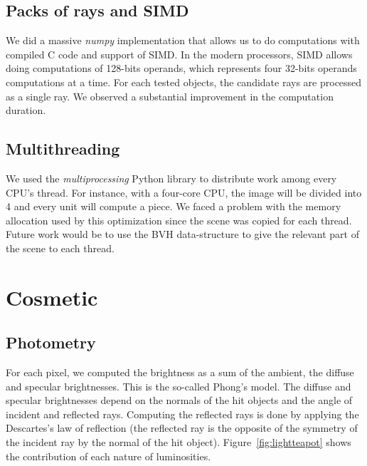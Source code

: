 \documentclass[a4paper,11pt]{article}%
\begin{document}
\subsection*{Packs of rays and SIMD}
We did a massive \textit{numpy} implementation that allows us to do computations with compiled C code and support of SIMD. In the modern processors, SIMD allows doing computations of 128-bits operands,
which represents four 32-bits operands computations at a time.
For each tested objects, the candidate rays are processed as a single ray.
We observed a substantial improvement in the computation duration.
\subsection*{Multithreading}
We used the \emph{multiprocessing} Python library to distribute work among every CPU's thread. For instance, with a four-core CPU, the image will be divided into 4 and every unit will compute a piece.
We faced a problem with the memory allocation used by this optimization since the scene was copied for each thread. Future work would be to use the BVH data-structure to give the relevant part of the scene to each thread. 

\section{Cosmetic}
\subsection*{Photometry}
For each pixel, we computed the brightness as a sum of the ambient, the diffuse and specular brightnesses. This is the so-called Phong's model.
The diffuse and specular brightnesses depend on the normals of the hit objects and the angle of incident and reflected rays.
Computing the reflected rays is done by applying the Descartes's law of reflection (the reflected ray is the opposite of the symmetry of the incident ray by the normal of the hit object). 
Figure~\ref{fig:lightteapot} shows the contribution of each nature of luminosities.
 
\end{document}
